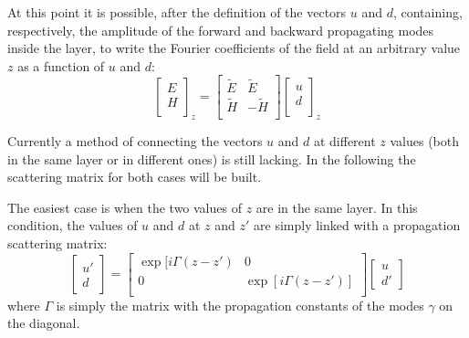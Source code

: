 \documentclass[a4paper,10pt]{report}
\begin{document}
At this point it is possible, after the definition of the vectors $u$ and $d$, containing, respectively, the amplitude of the forward and backward propagating modes inside the layer, to write the Fourier coefficients of the field at an arbitrary value $z$ as a function of $u$ and $d$:
\begin{equation}
\left[ \begin{array}{c} E \\ H \\ \end{array} \right]_z = 
\left[ \begin{array}{cc} \tilde{E} & \tilde{E} \\ \tilde{H} & -\tilde{H} \\  \end{array} \right] 
\left[ \begin{array}{c} u \\ d \\ \end{array} \right]_z
\end{equation}  

Currently a method of connecting the vectors $u$ and $d$ at different $z$ values (both in the same layer or in different ones) is still lacking. In the following the scattering matrix for both cases will be built. 

The easiest case is when the two values of $z$ are in the same layer. In this condition, the values of $u$ and $d$ at $z$ and $z'$ are simply linked with a propagation scattering matrix:
\begin{equation} \label{eq:prop_matrix}
\left[ \begin{array}{c} u' \\ d \end{array} \right] =
\left[ \begin{array}{cc} \exp[i\Gamma(z-z') & 0 \\ 0 & \exp[i\Gamma(z-z')] \\ \end{array} \right]
\left[ \begin{array}{c} u \\ d' \end{array} \right]
\end{equation}
where $\Gamma$ is simply the matrix with the propagation constants of the modes $\gamma$ on the diagonal. 
\end{document}
